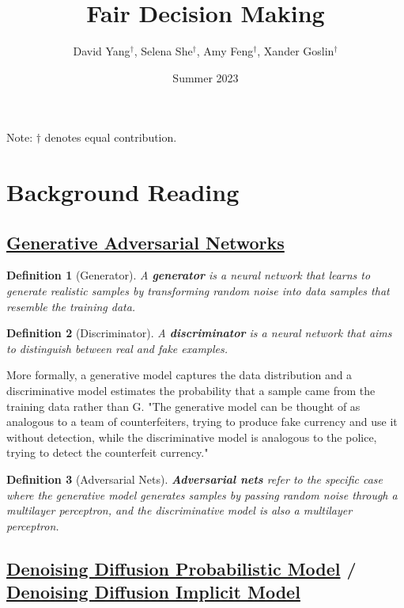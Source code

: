 \documentclass{article}
\title{Fair Decision Making}
\author{David Yang$^{\dagger}$, Selena She$^{\dagger}$, Amy Feng$^{\dagger}$, Xander Goslin$^{\dagger}$}
\date{Summer 2023}
\newtheorem{definition}{Definition}
\begin{document}
\maketitle

\begin{center}
    Note: $\dagger$ denotes equal contribution.
\end{center}

\section{Background Reading}
\subsection{\href{https://arxiv.org/abs/1406.2661}{Generative Adversarial Networks}}

\begin{definition}[Generator]
A \textbf{generator} is a neural network that learns to generate realistic samples by transforming random noise into data samples that resemble the training data.
\end{definition}

\begin{definition}[Discriminator]
A \textbf{discriminator} is a neural network that aims to distinguish between real and fake examples.
\end{definition}

More formally, a generative model captures the data distribution and a discriminative model estimates the probability that a sample came from the training data rather than G. "The generative model can be thought of as analogous to a team of counterfeiters, trying to produce fake currency and use it without detection, while the discriminative model is analogous to the police, trying to detect the counterfeit currency."

\begin{definition}[Adversarial Nets]
\textbf{Adversarial nets} refer to the specific case where the generative model generates samples by passing random noise through a multilayer perceptron, and the discriminative model is also a multilayer perceptron. 
\end{definition}

\subsection{\href{https://arxiv.org/abs/2006.11239}{Denoising Diffusion Probabilistic Model} / \href{https://arxiv.org/abs/2010.02502}{Denoising Diffusion Implicit Model}}
\end{document}
